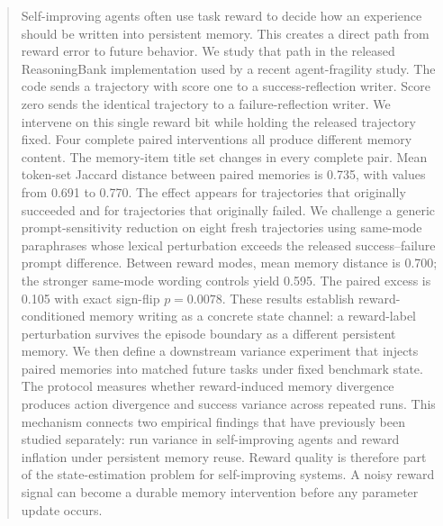 \begin{abstract}
Self-improving agents often use task reward to decide how an experience should be written into persistent memory. This creates a direct path from reward error to future behavior. We study that path in the released ReasoningBank implementation used by a recent agent-fragility study. The code sends a trajectory with score one to a success-reflection writer. Score zero sends the identical trajectory to a failure-reflection writer. We intervene on this single reward bit while holding the released trajectory fixed. Four complete paired interventions all produce different memory content. The memory-item title set changes in every complete pair. Mean token-set Jaccard distance between paired memories is 0.735, with values from 0.691 to 0.770. The effect appears for trajectories that originally succeeded and for trajectories that originally failed. We challenge a generic prompt-sensitivity reduction on eight fresh trajectories using same-mode paraphrases whose lexical perturbation exceeds the released success--failure prompt difference. Between reward modes, mean memory distance is 0.700; the stronger same-mode wording controls yield 0.595. The paired excess is 0.105 with exact sign-flip $p=0.0078$. These results establish reward-conditioned memory writing as a concrete state channel: a reward-label perturbation survives the episode boundary as a different persistent memory. We then define a downstream variance experiment that injects paired memories into matched future tasks under fixed benchmark state. The protocol measures whether reward-induced memory divergence produces action divergence and success variance across repeated runs. This mechanism connects two empirical findings that have previously been studied separately: run variance in self-improving agents and reward inflation under persistent memory reuse. Reward quality is therefore part of the state-estimation problem for self-improving systems. A noisy reward signal can become a durable memory intervention before any parameter update occurs.
\end{abstract}
